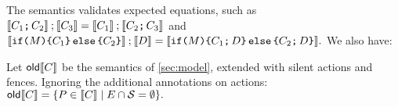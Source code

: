 The semantics validates expected equations, such as
\begin{math}
  \sem{\aCmd_1\SEMI\aCmd_2}\sequence\sem{\aCmd_3} =
  \sem{\aCmd_1}\sequence\sem{\aCmd_2\SEMI\aCmd_3}
\end{math}
and
\begin{math}
  \sem{\IF{\aExp} \THEN \aCmd_1 \ELSE \aCmd_2\FI}\sequence\sem{\bCmd} =
  \sem{\IF{\aExp} \THEN \aCmd_1 \SEMI\bCmd\ELSE \aCmd_2\SEMI\bCmd\FI}.
\end{math}
We also have:
\begin{theorem}
  \label{thm:seq}
Let $\semold{\aCmd}$ be the semantics of \textsection\ref{sec:model},
extended with silent actions and fences.  Ignoring the additional annotations
on actions:
\begin{math}
  \semold{\aCmd} = \{ \aPS\in\sem{\aCmd} \mid \disjoint{\Event}{\Sub}\}.
\end{math}
\end{theorem}


